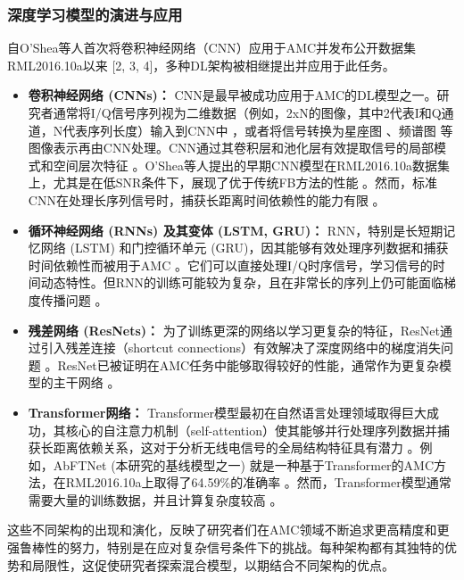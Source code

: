 \documentclass[conference]{IEEEtran}
\begin{document}
\subsubsection{深度学习模型的演进与应用}
自O'Shea等人首次将卷积神经网络（CNN）应用于AMC并发布公开数据集RML2016.10a以来 \cite{[34]}\cite{[35]}\cite{[36]} [2, 3, 4]，多种DL架构被相继提出并应用于此任务。
\begin{itemize}
    \item \textbf{卷积神经网络 (CNNs)：} CNN是最早被成功应用于AMC的DL模型之一。研究者通常将I/Q信号序列视为二维数据（例如，2xN的图像，其中2代表I和Q通道，N代表序列长度）输入到CNN中 \cite{[4]}\cite{[34]}，或者将信号转换为星座图 \cite{[19]}、频谱图 \cite{[29]} 等图像表示再由CNN处理。CNN通过其卷积层和池化层有效提取信号的局部模式和空间层次特征 \cite{[5]}。O'Shea等人提出的早期CNN模型在RML2016.10a数据集上，尤其是在低SNR条件下，展现了优于传统FB方法的性能 \cite{[34]}。然而，标准CNN在处理长序列信号时，捕获长距离时间依赖性的能力有限 \cite{[5]}。
    \item \textbf{循环神经网络 (RNNs) 及其变体 (LSTM, GRU)：} RNN，特别是长短期记忆网络 (LSTM) 和门控循环单元 (GRU)，因其能够有效处理序列数据和捕获时间依赖性而被用于AMC \cite{[14]}\cite{[28]}\cite{[29]}\cite{[37]}。它们可以直接处理I/Q时序信号，学习信号的时间动态特性。但RNN的训练可能较为复杂，且在非常长的序列上仍可能面临梯度传播问题 \cite{[5]}。
    \item \textbf{残差网络 (ResNets)：} 为了训练更深的网络以学习更复杂的特征，ResNet通过引入残差连接（shortcut connections）有效解决了深度网络中的梯度消失问题 \cite{[13]}\cite{[14]}。ResNet已被证明在AMC任务中能够取得较好的性能，通常作为更复杂模型的主干网络 \cite{[11]}\cite{[29]}\cite{[35]}。
    \item \textbf{Transformer网络：} Transformer模型最初在自然语言处理领域取得巨大成功，其核心的自注意力机制（self-attention）使其能够并行处理序列数据并捕获长距离依赖关系，这对于分析无线电信号的全局结构特征具有潜力 \cite{[29]}\cite{[38]}\cite{[39]}\cite{[40]}。例如，AbFTNet \cite{b3} (本研究的基线模型之一) 就是一种基于Transformer的AMC方法，在RML2016.10a上取得了64.59\%的准确率 \cite{[38]}\cite{[41]}。然而，Transformer模型通常需要大量的训练数据，并且计算复杂度较高 \cite{[5]}\cite{[39]}。
\end{itemize}
这些不同架构的出现和演化，反映了研究者们在AMC领域不断追求更高精度和更强鲁棒性的努力，特别是在应对复杂信号条件下的挑战。每种架构都有其独特的优势和局限性，这促使研究者探索混合模型，以期结合不同架构的优点。
\end{document}
